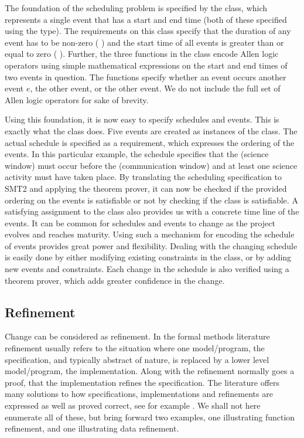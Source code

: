 The foundation of the scheduling problem is specified by the
 class, which represents a single event that has a start
and end time (both of these specified using the  type). The
requirements on this class specify that the duration of any event has
to be non-zero ( ) and the start time
of all events is greater than or equal to zero (
). Further, the three functions in the 
class encode Allen logic operators \cite{allen-logic-84} 
using simple mathematical
expressions on the start and end times of two events in
question. The functions specify whether an event occurs
 another event $e$,  the other event, or
 the other event. We do not include the full set of
Allen logic operators for sake of brevity. 

Using this foundation, it is now easy to specify schedules and
events. This is exactly what the  class does. Five
events are created as instances of the  class. The actual
schedule is specified as a requirement, which expresses the ordering
of the events. In this particular example, the schedule specifies that
the  (science window) must occur before the
 (communication window) and at least one science
activity must have taken place. By translating the scheduling
specification to SMT2 and applying the \zthree{} theorem prover, it
can now be checked if the provided ordering on the events is
satisfiable or not by checking if the  class is
satisfiable. A satisfying assignment to the class also provides us
with a concrete time line of the events.  It can be common for
schedules and events to change as the project evolves and reaches
maturity. Using such a mechanism for encoding the schedule of events
provides great power and flexibility. Dealing with the changing
schedule is easily done by either modifying existing constraints in
the  class, or by adding new events and
constraints. Each change in the schedule is also verified using a
theorem prover, which adds greater confidence in the change.


\subsection{Refinement}

Change can be considered as refinement. In the formal methods literature
refinement usually refers to the situation where one model/program, the 
specification, and typically abstract of nature, is replaced by a lower 
level model/program, the implementation. Along with the refinement normally
goes a proof, that the implementation refines the specification.
The literature offers many solutions to how specifications, implementations and 
refinements are expressed as well as proved correct, see for example 
\cite{vdm,raise92,george-raise-2008}. We shall not here enumerate all of these, but bring forward two examples, one illustrating function refinement, and one illustrating data refinement.

